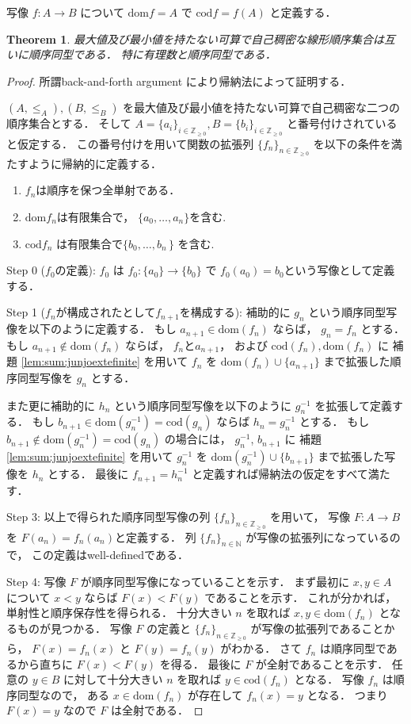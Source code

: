 \documentclass[leqno, a4paper, 12pt]{jsarticle}
\theoremstyle{plain}
\newtheorem{thm}{Theorem}[section]
\theoremstyle{definition}
\theoremstyle{remark}
\newcommand{\nn}{\mathbb{N}}
\newcommand{\zz}{\mathbb{Z}}
\newcommand{\dom}{\mathrm{dom}}
\newcommand{\cod}{\mathrm{cod}}
\numberwithin{equation}{section}
\begin{document}
写像
$f\colon A\to B$
について
$\dom f=A$
で
$\cod f =f(A)$
と定義する．
\begin{thm}\label{thm:sumbackforthproof}
最大値及び最小値を持たない可算で自己稠密な線形順序集合は互いに順序同型である．
特に有理数と順序同型である．
\end{thm}
\begin{proof}
所謂back-and-forth argument 
により帰納法によって証明する．

$(A,\le_A), 
(B,\le_B)$
を最大値及び最小値を持たない可算で自己稠密な二つの順序集合とする．
そして
$A=\{a_i\}_{i\in \zz_{\ge 0}}, B=\{b_i\}_{i\in \zz_{\ge 0}}$
と番号付けされていると仮定する．
この番号付けを用いて関数の拡張列
$\{f_{n}\}_{n\in \zz_{\ge 0}}$
を以下の条件を満たすように帰納的に定義する．
\begin{enumerate}[label=\textup{(\arabic*)}]
\item
$f_{n}$は順序を保つ全単射である．
\item 
$\dom f_{n}$は有限集合で，
$\{a_0,\dots, a_{n}\}$を含む.
\item $\cod f_{n}$
は有限集合で$\{b_{0},\dots,b_{n}\,\}$
を含む.
\end{enumerate}

Step 0 
($f_{0}$の定義):
$f_{0}$
は
$f_{0}\colon \{a_0\}\to \{b_0\}$
で
$f_{0}(a_{0})=b_{0}$という写像として定義する．

Step 1 ($f_{n}$が構成されたとして$f_{n+1}$を構成する):
補助的に
$g_n$
という順序同型写像を以下のように定義する．
もし
$a_{n+1}\in \dom(f_{n})$
ならば，
$g_{n}=f_{n}$
とする．
もし
$a_{n+1}\not\in \dom(f_{n})$
ならば，
$f_{n}$と$a_{n+1}$，
および
$\cod(f_{n}), \dom(f_{n})$
に
補題
\ref{lem:sum:junjoextefinite}
を用いて
$f_{n}$
を
$\dom(f_n)\cup \{a_{n+1}\}$
まで拡張した順序同型写像を
$g_{n}$
とする．

また更に補助的に
$h_{n}$
という順序同型写像を以下のように
$g_{n}^{-1}$
を拡張して定義する．
もし
$b_{n+1}\in \dom(g_{n}^{-1})=\cod(g_{n})$
ならば
$h_{n}=g_{n}^{-1}$
とする．
もし
$b_{n+1}\not\in \dom(g_n^{-1})=\cod(g_{n})$
の場合には，
$g_{n}^{-1}$, 
$b_{n+1}$
に
補題
\ref{lem:sum:junjoextefinite}
を用いて
$g_{n}^{-1}$
を
$\dom(g_{n}^{-1})\cup\{b_{n+1}\}$
まで拡張した写像を
$h_{n}$
とする．
最後に
$f_{n+1}=h_{n}^{-1}$
と定義すれば帰納法の仮定をすべて満たす．

Step 3: 
以上で得られた順序同型写像の列
$\{f_{n}\}_{n\in \zz_{\ge 0}}$
を用いて，
写像
$F\colon A\to B$
を
$F(a_n)=f_{n}(a_n)$と定義する．
列
$\{f_n\}_{n\in \nn}$
が写像の拡張列になっているので，
この定義はwell-definedである．


Step 4: 写像
$F$
が順序同型写像になっていることを示す．
まず最初に
$x, y\in A$
について
$x<y$
ならば
$F(x)<F(y)$
であることを示す．
これが分かれば，
単射性と順序保存性を得られる．
十分大きい
$n$
を取れば
$x, y\in \dom(f_{n})$
となるものが見つかる．
写像
$F$
の定義と
$\{f_{n}\}_{n\in \zz_{\ge 0}}$
が写像の拡張列であることから，
$F(x)=f_{n}(x)$
と
$F(y)=f_{n}(y)$
がわかる．
さて
$f_{n}$
は順序同型であるから直ちに
$F(x)<F(y)$
を得る．
最後に
$F$
が全射であることを示す．
任意の
$y\in B$
に対して十分大きい
$n$
を取れば
$y\in \cod(f_{n})$
となる．
写像
$f_{n}$
は順序同型なので，
ある
$x\in \dom(f_{n})$
が存在して
$f_{n}(x)=y$
となる．
つまり
$F(x)=y$
なので
$F$
は全射である．
\end{proof}
\end{document}
